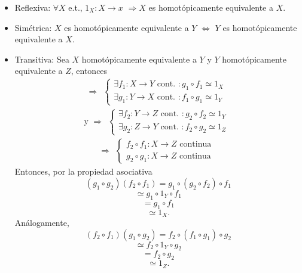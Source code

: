 \begin{dem}
  \begin{itemize}
    \item Reflexiva: $\forall X$ e.t., $1_{X} : X \to x$ $\Rightarrow X$ es homotópicamente equivalente a $X$.
    \item Simétrica: $X$ es homotópicamente equivalente a $Y$ $\Leftrightarrow$ $Y$ es homotópicamente equivalente a $X$.
    \item Transitiva: Sea $X$ homotópicamente equivalente a $Y$ y $Y$ homotópicamente equivalente a $Z$, entonces
      \[ 
        \Rightarrow
        \begin{aligned}
          \begin{cases}
            \exists f_{1} : X \to Y \text{ cont. } : g_{1} \circ f_{1} \simeq 1_{X} \\
            \exists g_{1} : Y \to X \text{ cont. } : f_{1} \circ g_{1} \simeq 1_{Y} 
          \end{cases}
        \end{aligned} 
      \] 
      \[ 
        \text{y } \Rightarrow
        \begin{aligned}
          \begin{cases}
            \exists f_{2} : Y \to Z \text{ cont. } : g_{2} \circ f_{2} \simeq 1_{Y} \\
            \exists g_{2} : Z \to Y \text{ cont. } : f_{2} \circ g_{2} \simeq 1_{Z} 
          \end{cases}
        \end{aligned} 
      \] 
      \[ 
        \Rightarrow
        \begin{aligned}
          \begin{cases}
             f_{2} \circ f_{1} : X \to Z \text{ continua} \\
             g_{2} \circ g_{1} : X \to Z \text{ continua} 
          \end{cases}
        \end{aligned}
      \] 
      Entonces, por la propiedad asociativa
      \[ 
        (g_{1} \circ g_{2}) (f_{2} \circ f_{1}) = g_{1} \circ (g_{2} \circ f_{2}) \circ f_{1}
      \]
      \[ 
        \simeq g_{1} \circ 1_{Y} \circ f_{1}
      \] 
      \[ 
        = g_{1} \circ f_{1} 
      \] 
      \[ 
        \simeq 1_{X}.
      \] 
      Análogamente, 
      \[ 
        (f_{2} \circ f_{1}) (g_{1} \circ g_{2}) = f_{2} \circ (f_{1} \circ g_{1}) \circ g_{2}
      \]
      \[ 
        \simeq f_{2} \circ 1_{Y} \circ g_{2}
      \] 
      \[ 
        = f_{2} \circ g_{2} 
      \] 
      \[ 
        \simeq 1_{Z}.
      \] 
  \end{itemize}
\end{dem}

